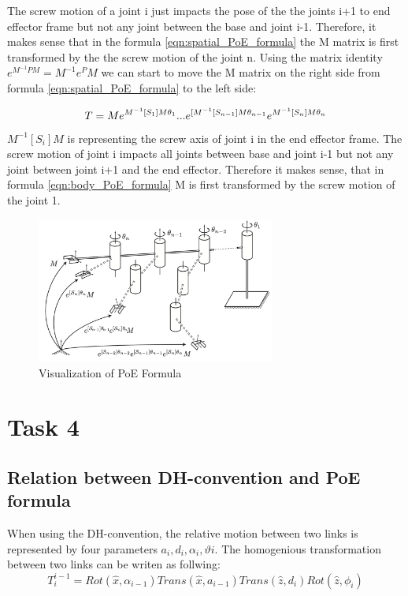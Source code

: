 \documentclass{tpk4170report}
\begin{document}
The screw motion of a joint i just impacts the pose of the the joints i+1 to end effector frame but not any joint between the base and joint i-1. Therefore, it makes sense that in the formula \ref{eqn:spatial_PoE_formula} the M matrix is first transformed by the the screw motion of the joint n. Using the matrix identity \(e^{M^{-1}PM} = M^{-1}e^{P}M\) we can start to move the M matrix on the right side from formula \ref{eqn:spatial_PoE_formula} to the left side: 

\begin{equation}
  T = M e^{M^{-1}[S_{1}]M\theta_{1}} ... e^{[M^{-1}[S_{n-1}]M\theta_{n-1}} e^{M^{-1}[S_{n}]M\theta_{n}} \\
  \label{eqn:body_PoE_formula}
\end{equation}
\(M^{-1}[S_{i}]M\) is representing the screw axis of joint i in the end effector frame. The screw motion of joint i impacts all joints between base and joint i-1 but not any joint between joint i+1 and the end effector. Therefore it makes sense, that in formula \ref{eqn:body_PoE_formula} M is first transformed by the screw motion of the joint 1. 


\begin{figure}
  \centering
  \includegraphics[width=0.7\textwidth]{assets/PoE_Visualization.pdf} 
  \caption{Visualization of PoE Formula}
  \label{fig:PoE_Visualization}
\end{figure}

\section{Task 4}

\subsection{Relation between DH-convention and PoE formula}
When using the DH-convention, the relative motion between two links is represented by four parameters \(a_{i}, d_{i}, \alpha_{i}, \vartheta{i}\). The homogenious transformation between two links can be writen as follwing: 
\begin{equation}
  T_{i}^{i-1} = Rot(\hat{x}, \alpha_{i-1}) Trans(\hat{x}, a_{i-1}) Trans(\hat{z}, d_{i})  Rot(\hat{z}, \phi_{i})
  \label{eqn:homogeniious_transformation_DH}
\end{equation}
\end{document}
